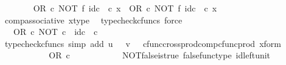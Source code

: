 \begin{isabellebody}
\ \ \ \ \ \ \isamarkupfalse%
\ {\isachardoublequoteopen}{\isacharparenleft}{\kern0pt}OR\ {\isasymcirc}\isactrlsub c\ NOT\ {\isasymtimes}\isactrlsub f\ id\isactrlsub c\ {\isasymOmega}{\isacharparenright}{\kern0pt}\ {\isasymcirc}\isactrlsub c\ x\ {\isacharequal}{\kern0pt}\ OR\ {\isasymcirc}\isactrlsub c\ {\isacharparenleft}{\kern0pt}NOT\ {\isasymtimes}\isactrlsub f\ id\isactrlsub c\ {\isasymOmega}{\isacharparenright}{\kern0pt}\ {\isasymcirc}\isactrlsub c\ x{\isachardoublequoteclose}\isanewline
\ \ \ \ \ \ \ \ \isamarkupfalse%
\ comp{\isacharunderscore}{\kern0pt}associative{}\ x{\isacharunderscore}{\kern0pt}type\ \isamarkupfalse%
\ {\isacharparenleft}{\kern0pt}typecheck{\isacharunderscore}{\kern0pt}cfuncs{\isacharcomma}{\kern0pt}\ force{\isacharparenright}{\kern0pt}\isanewline
\ \ \ \ \ \ \isamarkupfalse%
\ \isamarkupfalse%
\ {\isachardoublequoteopen}{\isachardot}{\kern0pt}{\isachardot}{\kern0pt}{\isachardot}{\kern0pt}\ {\isacharequal}{\kern0pt}\ OR\ {\isasymcirc}\isactrlsub c\ {\isasymlangle}NOT\ {\isasymcirc}\isactrlsub c\ {\isasymf}{\isacharcomma}{\kern0pt}\ id\isactrlsub c\ {\isasymOmega}\ {\isasymcirc}\isactrlsub c\ {\isasymf}{\isasymrangle}{\isachardoublequoteclose}\isanewline
\ \ \ \ \ \ \ \ \isamarkupfalse%
\ {\isacharparenleft}{\kern0pt}typecheck{\isacharunderscore}{\kern0pt}cfuncs{\isacharcomma}{\kern0pt}\ simp\ add{\isacharcolon}{\kern0pt}\ {\isacartoucheopen}u\ {\isacharequal}{\kern0pt}\ {\isasymf}{\isacartoucheclose}\ {\isacartoucheopen}v\ {\isacharequal}{\kern0pt}\ {\isasymf}{\isacartoucheclose}\ cfunc{\isacharunderscore}{\kern0pt}cross{\isacharunderscore}{\kern0pt}prod{\isacharunderscore}{\kern0pt}comp{\isacharunderscore}{\kern0pt}cfunc{\isacharunderscore}{\kern0pt}prod\ x{\isacharunderscore}{\kern0pt}form{\isacharparenright}{\kern0pt}\isanewline
\ \ \ \ \ \ \isamarkupfalse%
\ \isamarkupfalse%
\ {\isachardoublequoteopen}{\isachardot}{\kern0pt}{\isachardot}{\kern0pt}{\isachardot}{\kern0pt}\ {\isacharequal}{\kern0pt}\ OR\ {\isasymcirc}\isactrlsub c\ {\isasymlangle}{\isasymt}{\isacharcomma}{\kern0pt}\ {\isasymf}{\isasymrangle}{\isachardoublequoteclose}\isanewline
\ \ \ \ \ \ \ \ \isamarkupfalse%
\ NOT{\isacharunderscore}{\kern0pt}false{\isacharunderscore}{\kern0pt}is{\isacharunderscore}{\kern0pt}true\ false{\isacharunderscore}{\kern0pt}func{\isacharunderscore}{\kern0pt}type\ id{\isacharunderscore}{\kern0pt}left{\isacharunderscore}{\kern0pt}unit{}\ \isamarkupfalse%

\end{isabellebody}
